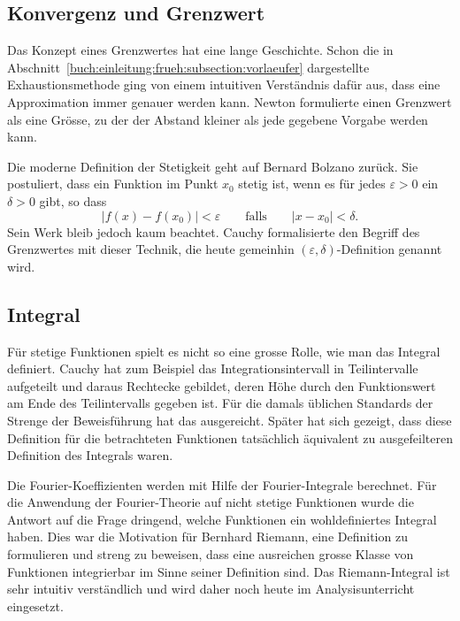 %
%
\subsection{Konvergenz und Grenzwert}
Das Konzept eines Grenzwertes hat eine lange Geschichte.
%
Schon die in Abschnitt~\ref{buch:einleitung:frueh:subsection:vorlaeufer}
dargestellte Exhaustionsmethode ging von einem intuitiven Verständnis
dafür aus, dass eine Approximation immer genauer werden kann.
%
Newton formulierte einen Grenzwert als eine Grösse, zu der der Abstand
%
kleiner als jede gegebene Vorgabe werden kann.

Die moderne Definition der Stetigkeit geht auf Bernard Bolzano
%
zurück.
%
Sie postuliert, dass ein Funktion im Punkt $x_0$ stetig ist, wenn
es für jedes $\varepsilon>0$ ein $\delta >0$ gibt, so dass
\[
|f(x)-f(x_0)|<\varepsilon
\qquad\text{falls}\qquad
|x-x_0|<\delta.
\]
Sein Werk bleib jedoch kaum beachtet.
Cauchy formalisierte den Begriff des Grenzwertes mit dieser Technik,
%
die heute gemeinhin $(\varepsilon,\delta)$-Definition genannt wird.

\subsection{Integral}
Für stetige Funktionen spielt es nicht so eine grosse Rolle, wie man 
das Integral definiert.
Cauchy hat zum Beispiel das Integrationsintervall in Teilintervalle 
aufgeteilt und daraus Rechtecke gebildet, deren Höhe durch den Funktionswert
am Ende des Teilintervalls gegeben ist.
Für die damals üblichen Standards der Strenge der Beweisführung hat
das ausgereicht.
Später hat sich gezeigt, dass diese Definition für die betrachteten
Funktionen tatsächlich äquivalent zu ausgefeilteren Definition des
Integrals waren.

Die Fourier-Koeffizienten werden mit Hilfe der Fourier-Integrale
berechnet.
Für die Anwendung der Fourier-Theorie auf nicht stetige Funktionen
wurde die Antwort auf die Frage dringend, welche Funktionen ein
wohldefiniertes Integral haben.
Dies war die Motivation für Bernhard Riemann, eine Definition 
%
zu formulieren und streng zu beweisen, dass eine ausreichen grosse
Klasse von Funktionen integrierbar im Sinne seiner Definition sind.
Das Riemann-Integral ist sehr intuitiv verständlich und wird daher
%
noch heute im Analysisunterricht eingesetzt.

